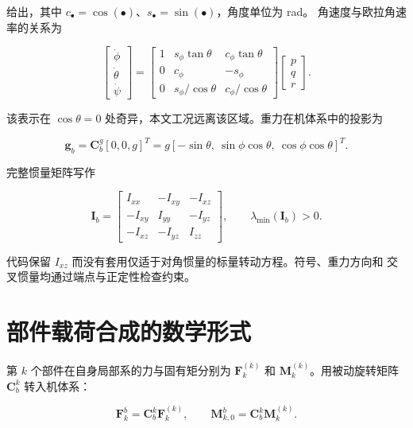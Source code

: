 \documentclass[UTF8,12pt,oneside,openany,fontset=windows]{ctexbook}
\begin{document}
给出，其中 \(c_\bullet=\cos(\bullet)\)、\(s_\bullet=\sin(\bullet)\)，角度单位为 rad。 角速度与欧拉角速率的关系为

\begin{equation}
\begin{bmatrix}\dot\phi\\\dot\theta\\\dot\psi\end{bmatrix}
=
\begin{bmatrix}
1&s_\phi\tan\theta&c_\phi\tan\theta\\
0&c_\phi&-s_\phi\\
0&s_\phi/\cos\theta&c_\phi/\cos\theta
\end{bmatrix}
\begin{bmatrix}p\\q\\r\end{bmatrix}.
\end{equation}

该表示在 \(\cos\theta=0\) 处奇异，本文工况远离该区域。重力在机体系中的投影为

\begin{equation}
\mathbf g_b=\mathbf C_b^g[0,0,g]^T
=g[-\sin\theta,\ \sin\phi\cos\theta,\ \cos\phi\cos\theta]^T.
\end{equation}

完整惯量矩阵写作

\begin{equation}
\mathbf I_b=\begin{bmatrix}I_{xx}&-I_{xy}&-I_{xz}\\-I_{xy}&I_{yy}&-I_{yz}\\-I_{xz}&-I_{yz}&I_{zz}\end{bmatrix},
\qquad \lambda_{\min}(\mathbf I_b)>0.
\end{equation}

代码保留 \(I_{xz}\) 而没有套用仅适于对角惯量的标量转动方程。符号、重力方向和 交叉惯量均通过端点与正定性检查约束。

\section{部件载荷合成的数学形式}

第 \(k\) 个部件在自身局部系的力与固有矩分别为 \(\mathbf F_k^{(k)}\) 和 \(\mathbf M_k^{(k)}\)。用被动旋转矩阵 \(\mathbf C_b^k\) 转入机体系：

\begin{equation}
\mathbf F_k^b=\mathbf C_b^k\mathbf F_k^{(k)},\qquad
\mathbf M_{k,0}^b=\mathbf C_b^k\mathbf M_k^{(k)}.
\end{equation}
\end{document}
